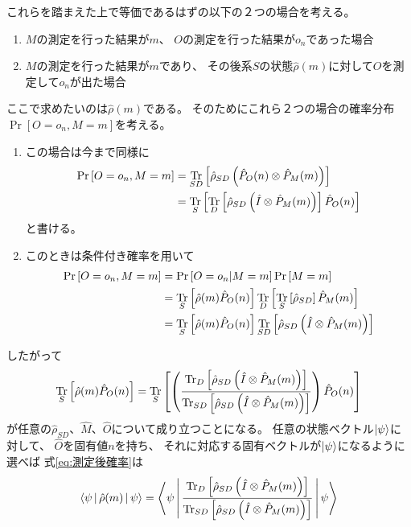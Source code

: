 \documentclass[a4paper, 10pt, uplatex]{jsarticle}
\begin{document}
これらを踏まえた上で等価であるはずの以下の２つの場合を考える。
\begin{enumerate}
	\item $M$の測定を行った結果が$m$、
	$O$の測定を行った結果が$o_n$であった場合
	\label{cs:同時測定}
	\item $M$の測定を行った結果が$m$であり、
	その後系$S$の状態$\hat{\rho} (m)$に対して$O$を測定して$o_n$が出た場合
	\label{cs:測定後}
\end{enumerate}
ここで求めたいのは$\hat{\rho} (m)$である。
そのためにこれら２つの場合の確率分布
$\Pr \left[ O = o_n, M = m \right]$を考える。
\begin{enumerate}
	\item この場合は今まで同様に
	\begin{align}
		\Pr \left[ O = o_n, M = m \right]
		&= \operatorname*{Tr}_{SD} \left[ \hat{\rho}_{SD}
		\left( \hat{P}_O (n) \otimes \hat{P}_M (m) \right) \right] \\
		&= \operatorname*{Tr}_S \left[ \operatorname*{Tr}_D \left[ \hat{\rho}_{SD}
		\left( \hat{I} \otimes \hat{P}_M (m) \right) \right]
		\hat{P}_O (n)\right]
	\end{align}
	と書ける。
	\item このときは条件付き確率を用いて
	\begin{align}
		\Pr \left[ O = o_n, M = m \right]
		&= \Pr \left[ O = o_n \middle| M = m \right]
		\Pr \left[ M = m \right] \\
		&= \operatorname*{Tr}_S \left[ \hat{\rho} (m) \hat{P}_O (n) \right]
		\operatorname*{Tr}_D \left[ \operatorname*{Tr}_S \left[ \hat{\rho}_{SD} \right]
		\hat{P}_M (m) \right] \\
		&= \operatorname*{Tr}_S \left[ \hat{\rho} (m) \hat{P}_O (n) \right]
		\operatorname*{Tr}_{SD} \left[ \hat{\rho}_{SD}
		\left( \hat{I} \otimes \hat{P}_M (m) \right) \right]
	\end{align}
\end{enumerate}
したがって
\begin{align}
	\operatorname*{Tr}_S \left[ \hat{\rho} (m) \hat{P}_O (n) \right]
	= \operatorname*{Tr}_S \left[ \left( 
		\frac{\operatorname*{Tr}_D \left[ \hat{\rho}_{SD}
		\left( \hat{I} \otimes \hat{P}_M (m) \right) \right]}
		{\operatorname*{Tr}_{SD} \left[ \hat{\rho}_{SD}
		\left( \hat{I} \otimes \hat{P}_M (m) \right) \right]}
	\right) \hat{P}_O (n) \right]
	\label{eq:測定後確率}
\end{align}
が任意の$\hat{\rho}_{SD}$、$\hat{M}$、$\hat{O}$について成り立つことになる。
任意の状態ベクトル$\Ket{\psi}$に対して、
$\hat{O}$を固有値$n$を持ち、
それに対応する固有ベクトルが$\Ket{\psi}$になるように選べば
式\eqref{eq:測定後確率}は
\begin{align}
	\Braket{\psi | \hat{\rho} (m) | \psi}
	= \Braket{\psi |
	\frac{\operatorname*{Tr}_D \left[ \hat{\rho}_{SD}
	\left( \hat{I} \otimes \hat{P}_M (m) \right) \right]}
	{\operatorname*{Tr}_{SD} \left[ \hat{\rho}_{SD}
	\left( \hat{I} \otimes \hat{P}_M (m) \right) \right]}
	| \psi}
\end{align}
\end{document}
